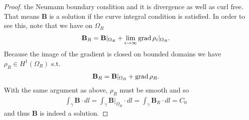 \documentclass[../main.tex]{subfiles}
\begin{document}
\begin{proof}
    the Neumann boundary condition and it is divergence as well as curl free.
    That means $\mathbf{B}$ is a solution if the curve integral condition is satisfied.
    In order to see this, note that we have on $\Omega_R$
    \begin{align*}
        \mathbf{B}_R = \mathbf{B}|_{\Omega_R} +\lim\limits_{i\rightarrow \infty}\operatorname{grad} \rho_i|_{\Omega_R}.
    \end{align*}
    Because the image of the gradient is closed on bounded domains 
    we have $\rho_R \in H^1(\Omega_R)$ s.t.
    \begin{align*}
        \mathbf{B}_R = \mathbf{B}|_{\Omega_R} + \operatorname{grad} \rho_R.
    \end{align*}
    With the same argument as above, $\rho_R$ must be smooth and so
    \begin{align*}
        \int_\gamma \mathbf{B} \cdot dl =  \int_\gamma \mathbf{B}|_{\Omega_R} \cdot dl 
        =  \int_\gamma \mathbf{B}_R \cdot dl = C_0
    \end{align*}
    and thus $\mathbf{B}$ is indeed a solution.
\end{proof}
\end{document}

